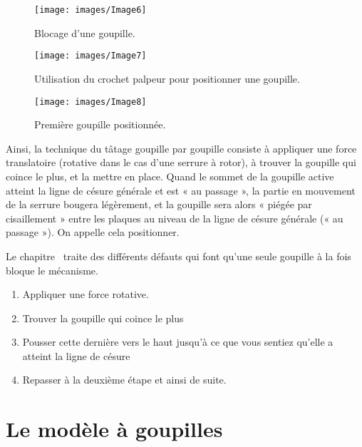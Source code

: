 \documentclass[a4paper,french,11pt,twoside]{report}
\begin{document}
\begin{figure}[ht]
  \begin{center}
    \texttt{[image: images/Image6]}
    \caption{Blocage d'une goupille.\label{blocage_goupille}}
  \end{center}
\end{figure}

\begin{figure}[ht]
  \begin{center}
    \texttt{[image: images/Image7]}
    \caption{Utilisation du crochet palpeur pour positionner une goupille.\label{crochet_goupille}}
  \end{center}
\end{figure}

\begin{figure}[ht]
  \begin{center}
    \texttt{[image: images/Image8]}
    \caption{Première goupille positionnée.\label{goupille_positionnee}}
  \end{center}
\end{figure}


Ainsi, la technique du tâtage goupille par goupille consiste à appliquer une force translatoire (rotative dans le cas d'une serrure à rotor), à trouver la goupille qui coince le plus, et la mettre en place. Quand le sommet de la goupille active atteint la ligne de césure générale et est « au passage », la partie en mouvement de la serrure bougera légèrement, et la goupille sera alors « piégée par cisaillement » entre les plaques au niveau de la ligne de césure générale (« au passage »). On appelle cela positionner.

Le chapitre~ traite des différents défauts qui font qu'une seule goupille à la fois bloque le mécanisme.

\begin{enumerate}
    \item{Appliquer une force rotative.}
    \item{Trouver la goupille qui coince le plus}
    \item{Pousser cette dernière vers le haut jusqu'à ce que vous sentiez qu'elle a atteint la ligne de césure}
    \item{Repasser à la deuxième étape et ainsi de suite. }
\end{enumerate}

\chapter{\label{chap:modele_goupilles}Le modèle à goupilles}
\end{document}
